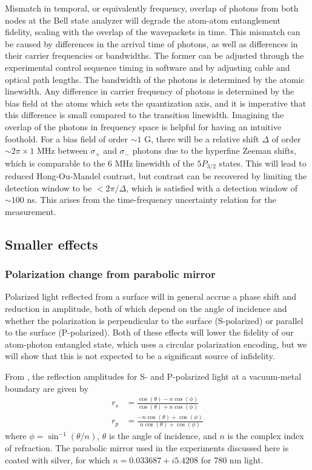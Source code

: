 Mismatch in temporal, or equivalently frequency, overlap of photons from both nodes at the Bell state analyzer will degrade the atom-atom entanglement fidelity, scaling with the overlap of the wavepackets in time. This mismatch can be caused by differences in the arrival time of photons, as well as differences in their carrier frequencies or bandwidths. The former can be adjusted through the experimental control sequence timing in software and by adjusting cable and optical path lengths. The bandwidth of the photons is determined by the atomic linewidth. Any difference in carrier frequency of photons is determined by the bias field at the atoms which sets the quantization axis, and it is imperative that this difference is small compared to the transition linewidth. Imagining the overlap of the photons in frequency space is helpful for having an intuitive foothold. For a bias field of order $\sim1$ G, there will be a relative shift $\Delta$ of order $\sim2\pi\times1$ MHz between $\sigma_+$ and $\sigma_-$ photons due to the hyperfine Zeeman shifts, which is comparable to the $6$ MHz linewidth of the $5P_{3/2}$ states. This will lead to reduced Hong-Ou-Mandel contrast, but contrast can be recovered by limiting the detection window to be $< 2\pi/\Delta$, which is satisfied with a detection window of $\sim100$ ns. This arises from the time-frequency uncertainty relation for the measurement.

\subsection{Smaller effects}
\subsubsection{Polarization change from parabolic mirror}

Polarized light reflected from a surface will in general accrue a phase shift and reduction in amplitude, both of which depend on the angle of incidence and whether the polarization is perpendicular to the surface (S-polarized) or parallel to the surface (P-polarized). Both of these effects will lower the fidelity of our atom-photon entangled state, which uses a circular polarization encoding, but we will show that this is not expected to be a significant source of infidelity.

From \cite{fowles1989introduction}, the reflection amplitudes for S- and P-polarized light at a vacuum-metal boundary are given by
\begin{align}
    r_s &= \frac{\cos(\theta)-n\cos(\phi)}{\cos(\theta)+n\cos(\phi)} \\
    r_p &= \frac{-n\cos(\theta)+\cos(\phi)}{n\cos(\theta)+\cos(\phi)}
\end{align}
where $\phi = \sin^{-1}(\theta/n)$, $\theta$ is the angle of incidence, and $n$ is the complex index of refraction. The parabolic mirror used in the experiments discussed here is coated with silver, for which $n=0.033687+i 5.4208$ for 780 nm light.

